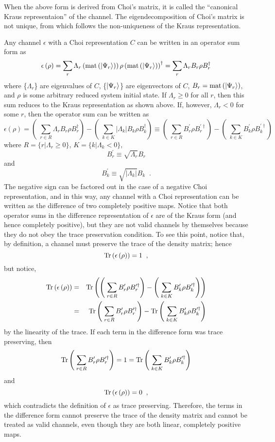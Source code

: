 When the above form is derived from Choi's matrix, it is called the ``canonical Kraus representaion'' of the channel.  The eigendecomposition of Choi's matrix is not unique, from which follows the non-uniqueness of the Kraus representation.  

Any channel $\epsilon$ with a Choi representation $C$ can be written in an operator sum form as
$$
\epsilon\left(\rho\right) = \sum_r \Lambda_r \left(\operatorname{mat}\left(\left|\Psi_r\right\rangle\right)\right)\rho\left(\operatorname{mat}\left(\left|\Psi_r\right\rangle\right)\right)^\dagger = \sum_r \Lambda_r B_r \rho B_r^\dagger
$$
where \{$\Lambda_r$\} are eigenvalues of $C$, \{$\left|\Psi_r\right\rangle$\} are eigenvectors of $C$, $B_r = \operatorname{mat}\left(\left|\Psi_r\right\rangle\right)$, and $\rho$ is some arbitrary reduced system initial state.  If $\Lambda_r\ge 0$ for all $r$, then this sum reduces to the Kraus representation as shown above.  If, however, $\Lambda_r<0$ for some $r$, then the operator sum can be written as
$$
\epsilon\left(\rho\right) = \left(\;\sum_{r\in R} \Lambda_r B_r \rho B_r^\dagger\right) - \left(\;\sum_{k\in K} |\Lambda_k| B_k \rho B_k^\dagger\right) \equiv \left(\;\sum_{r\in R} B_r^\prime \rho B_r^{\prime\dagger}\right) - \left(\;\sum_{k\in K} B_k^\prime \rho B_k^{\prime\dagger}\right) 
$$
where $R = \{r|\Lambda_r\ge 0\}$, $K = \{k|\Lambda_k < 0\}$,
$$
B_r^\prime \equiv \sqrt{\Lambda_r} B_r
$$
and
$$
B_k^\prime \equiv \sqrt{|\Lambda_k|} B_k\;\;.
$$
The negative sign can be factored out in the case of a negative Choi representation, and in this way, any channel with a Choi representation can be written as the difference of two completely positive maps.  Notice that both operator sums in the difference representation of $\epsilon$ are of the Kraus form (and hence completely positive), but they are not valid channels by themselves because they do not obey the trace preservation condition.  To see this point, notice that, by definition, a channel must preserve the trace of the density matrix; hence
$$
\operatorname{Tr}\left(\epsilon\left(\rho\right)\right) = 1\;\;,
$$
but notice,
\begin{eqnarray*}
\operatorname{Tr}\left(\epsilon\left(\rho\right)\right) &=& \operatorname{Tr}\left(\left(\;\sum_{r\in R} B_r^\prime \rho B_r^{\prime\dagger}\right) - \left(\;\sum_{k\in K} B_k^\prime \rho B_k^{\prime\dagger}\right)\right)\\
&=&\operatorname{Tr}\left(\;\sum_{r\in R} B_r^\prime \rho B_r^{\prime\dagger}\right) - \operatorname{Tr}\left(\;\sum_{k\in K} B_k^\prime \rho B_k^{\prime\dagger}\right)
\end{eqnarray*}
by the linearity of the trace.  If each term in the difference form was trace preserving, then
$$
\operatorname{Tr}\left(\;\sum_{r\in R} B_r^\prime \rho B_r^{\prime\dagger}\right) = 1 = \operatorname{Tr}\left(\;\sum_{k\in K} B_k^\prime \rho B_k^{\prime\dagger}\right)
$$
and
$$
\operatorname{Tr}\left(\epsilon\left(\rho\right)\right) = 0\;\;,
$$
which contradicts the definition of $\epsilon$ as trace preserving.  Therefore, the terms in the difference form cannot preserve the trace of the density matrix and cannot be treated as valid channels, even though they are both linear, completely positive maps.

